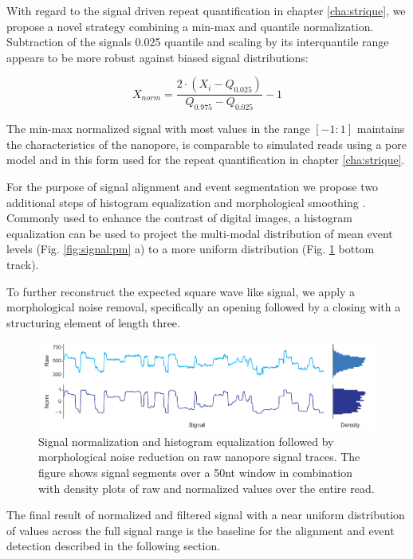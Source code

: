 With regard to the signal driven repeat quantification in chapter \ref{cha:strique}, we propose a novel strategy combining a min-max and quantile normalization. Subtraction of the signals 0.025 quantile and scaling by its interquantile range appears to be more robust against biased signal distributions:

\begin{equation}
	X_{norm} = \frac{2 \cdot (X_{i} - Q_{0.025})}{Q_{0.975} - Q_{0.025}} - 1
\end{equation}

The min-max normalized signal with most values in the range $ [-1:1] $ maintains the characteristics of the nanopore, is comparable to simulated reads using a pore model and in this form used for the repeat quantification in chapter \ref{cha:strique}.

For the purpose of signal alignment and event segmentation we propose two additional steps of  histogram equalization and morphological smoothing \cite{Gonzalez2006}. Commonly used to enhance the contrast of digital images, a histogram equalization can be used to project the multi-modal distribution of mean event levels (Fig. \ref{fig:signal:pm} a) to a more uniform distribution (Fig. \ref{fig:signal:normalization} bottom track). 

To further reconstruct the expected square wave like signal, we apply a morphological noise removal, specifically an opening followed by a closing with a structuring element of length three.

\begin{figure}[h]
	\centering
	\includegraphics[width=1.0\textwidth]{figures/signal/normalization.pdf}
	\captionsetup{format=plain}
	\caption[Signal normalization and histogram equalization]{Signal normalization and histogram equalization followed by morphological noise reduction on raw nanopore signal traces. The figure shows signal segments over a 50nt window in combination with density plots of raw and normalized values over the entire read.}
	\label{fig:signal:normalization}
\end{figure}

The final result of normalized and filtered signal with a near uniform distribution of values across the full signal range is the baseline for the alignment and event detection described in the following section.




